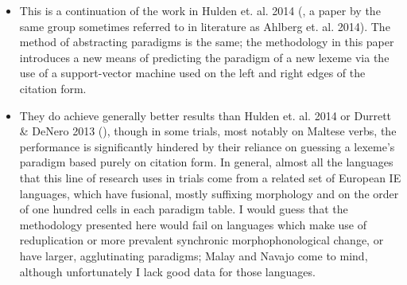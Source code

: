 \documentclass[12pt]{report}
\begin{document}
\begin{itemize}
	
	\item This is a continuation of the work in Hulden et. al. 2014 (\cite{Hulden2014}, a paper by the same group sometimes referred to in literature as Ahlberg et. al. 2014). The method of abstracting paradigms is the same; the methodology in this paper introduces a new means of predicting the paradigm of a new lexeme via the use of a support-vector machine used on the left and right edges of the citation form.
	
	\item They do achieve generally better results than Hulden et. al. 2014 or Durrett \& DeNero 2013 (\cite{Durrett2013}), though in some trials, most notably on Maltese verbs, the performance is significantly hindered by their reliance on guessing a lexeme's paradigm based purely on citation form. In general, almost all the languages that this line of research uses in trials come from a related set of European IE languages, which have fusional, mostly suffixing morphology and on the order of one hundred cells in each paradigm table. I would guess that the methodology presented here would fail on languages which make use of reduplication or more prevalent synchronic morphophonological change, or have larger, agglutinating paradigms; Malay and Navajo come to mind, although unfortunately I lack good data for those languages.
	 
\end{itemize}

\end{document}
